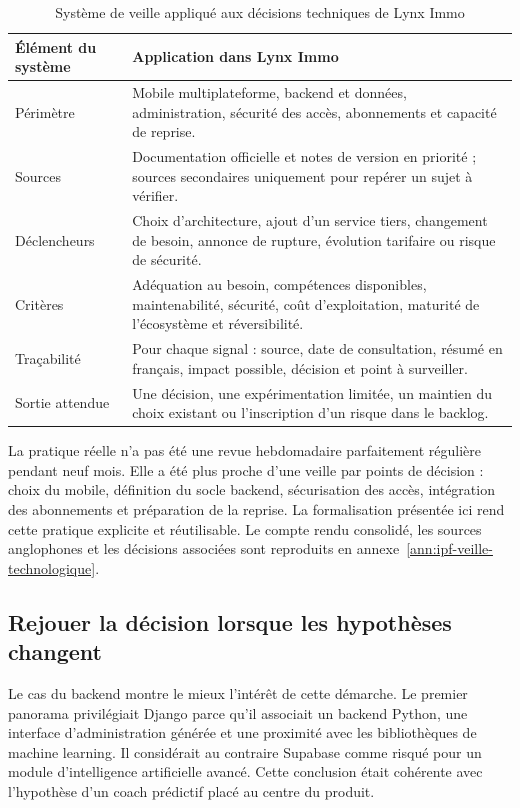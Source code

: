 \begin{table}[H]
\centering
\small
\begin{tabular}{p{3.7cm} p{10.2cm}}
\toprule
\textbf{Élément du système} & \textbf{Application dans Lynx Immo} \\
\midrule
Périmètre & Mobile multiplateforme, backend et données, administration, sécurité des accès, abonnements et capacité de reprise. \\
Sources & Documentation officielle et notes de version en priorité ; sources secondaires uniquement pour repérer un sujet à vérifier. \\
Déclencheurs & Choix d'architecture, ajout d'un service tiers, changement de besoin, annonce de rupture, évolution tarifaire ou risque de sécurité. \\
Critères & Adéquation au besoin, compétences disponibles, maintenabilité, sécurité, coût d'exploitation, maturité de l'écosystème et réversibilité. \\
Traçabilité & Pour chaque signal : source, date de consultation, résumé en français, impact possible, décision et point à surveiller. \\
Sortie attendue & Une décision, une expérimentation limitée, un maintien du choix existant ou l'inscription d'un risque dans le backlog. \\
\bottomrule
\end{tabular}
\caption{Système de veille appliqué aux décisions techniques de Lynx Immo}
\label{tab:lynx-systeme-veille}
\end{table}

La pratique réelle n'a pas été une revue hebdomadaire parfaitement régulière pendant neuf mois. Elle a été plus proche d'une veille par points de décision : choix du mobile, définition du socle backend, sécurisation des accès, intégration des abonnements et préparation de la reprise. La formalisation présentée ici rend cette pratique explicite et réutilisable. Le compte rendu consolidé, les sources anglophones et les décisions associées sont reproduits en annexe~\ref{ann:ipf-veille-technologique}.

\subsection{Rejouer la décision lorsque les hypothèses changent}

Le cas du backend montre le mieux l'intérêt de cette démarche. Le premier panorama privilégiait Django parce qu'il associait un backend Python, une interface d'administration générée et une proximité avec les bibliothèques de machine learning. Il considérait au contraire Supabase comme risqué pour un module d'intelligence artificielle avancé. Cette conclusion était cohérente avec l'hypothèse d'un coach prédictif placé au centre du produit.

